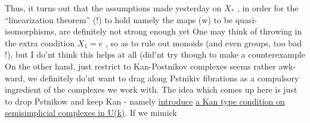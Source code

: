 Thus,  it turns out that the assumptions made yesterday on $X_{*}$ ,
in order for the ``linearization theorem'' (!) to hold\hand{,} namely the maps (w)
to be quasi-isomorphisms,  are definitely not strong enough yet One
may think of throwing in the extra condition  $X_{1}=e$ ,  so as to rule out
monoids (and even groups, too bad !),   but I do'nt think this
helps at all (did'nt try though to make a counterexample  On the
other hand,  just restrict to Kan-Postnikov complexes seems rather awk-%
ward,   we definitely do'nt want to drag along Pstnikiv fibrations as
a compulsory ingredient of the complexes we work with.  The idea which
comes up here is just to drop Pstnikow and keep Kan -  namely \uline{introduce}
\uline{a Kan type condition on semisimplicial complexes in U(k)}.  If we mimick


